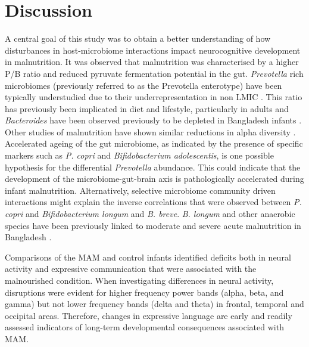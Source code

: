 \documentclass{article}
\begin{document}
\section*{Discussion}
A central goal of this study was to obtain a better understanding of how disturbances in host-microbiome interactions impact neurocognitive development in malnutrition.
It was observed that malnutrition was characterised by a higher \gls{P/B} ratio and reduced pyruvate fermentation potential in the gut.
\textit{Prevotella} rich microbiomes (previously referred to as the Prevotella enterotype) have been typically understudied due to their underrepresentation in non \gls{LMIC} \cite{tett2019prevotella}.
This ratio has previously been implicated in diet and lifestyle, particularly in adults \cite{hjorth2019prevotella} and \textit{Bacteroides} have been observed previously to be depleted in Bangladesh infants \cite{roger2022impact}.
Other studies of malnutrition have shown similar reductions in alpha diversity \cite{roger2022impact}.
Accelerated ageing of the gut microbiome, as indicated by the presence of specific markers such as \textit{P. copri} and \textit{Bifidobacterium adolescentis}, is one possible hypothesis for the differential \textit{Prevotella} abundance.
This could indicate that the development of the microbiome-gut-brain axis is pathologically accelerated during infant malnutrition.
Alternatively, selective microbiome community driven interactions might explain the inverse correlations that were observed between \textit{P. copri}  and \textit{Bifidobacterium longum} and \textit{B. breve}. \textit{B. longum} and other anaerobic species have been previously linked to moderate and severe acute malnutrition in Bangladesh \cite{barratt2022bifidobacterium,  million2016increased}.

Comparisons of the \gls{MAM} and control infants identified deficits both in neural activity and expressive communication that were associated with the malnourished condition.
When investigating differences in neural activity, disruptions were evident for higher frequency power bands (alpha, beta, and gamma) but not lower frequency bands (delta and theta) in frontal, temporal and occipital areas.
Therefore, changes in expressive language are early and readily assessed indicators of long-term developmental consequences associated with \gls{MAM}.
\end{document}
